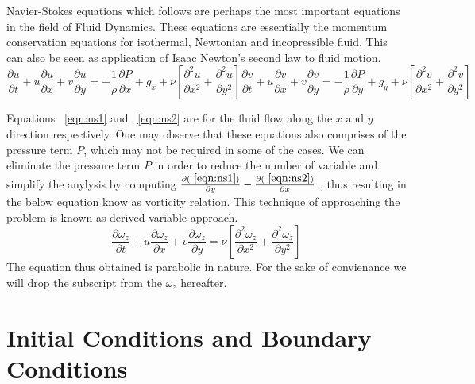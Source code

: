 \documentclass{article}
\begin{document}
Navier-Stokes equations which follows are perhaps the most important equations in the field of Fluid Dynamics. These equations are essentially the momentum conservation equations for isothermal, Newtonian and incopressible fluid. This can also be seen as application of Isaac Newton's second law to fluid motion.
\begin{subequations}
\begin{equation}
\label{eqn:ns1}
\frac{\partial u}{\partial t} + u\frac{\partial u}{\partial x} + v\frac{\partial u}{\partial y}= -\frac{1}{\rho}\frac{\partial P}{\partial x} + g_x + \nu \left [ \frac{\partial^2 u}{\partial x^2} +  \frac{\partial^2 u}{\partial y^2} \right ]
\end{equation}

\begin{equation}
\label{eqn:ns2}
\frac{\partial v}{\partial t} + u\frac{\partial v}{\partial x} + v\frac{\partial v}{\partial y}= -\frac{1}{\rho}\frac{\partial P}{\partial y} + g_y + \nu \left [ \frac{\partial^2 v}{\partial x^2} +  \frac{\partial^2 v}{\partial y^2} \right ]
\end{equation}
\end{subequations}

Equations ~\ref{eqn:ns1} and ~\ref{eqn:ns2} are for the fluid flow along the $x$ and $y$ direction respectively.  One may observe that these equations also comprises of the pressure term $P$, which may not be required in some of the cases. We can eliminate the pressure term $P$ in order to reduce the number of variable and simplify the anylysis by computing $\frac{\partial (~\ref{eqn:ns1})}{\partial y} - \frac{\partial (~\ref{eqn:ns2})}{\partial x} $ , thus resulting in the below equation know as vorticity relation. This technique of approaching the problem is known as derived variable approach. 
\begin{equation}
\label{eqn:vorticityFnEqn}
\frac{\partial \omega_z}{\partial t} + u\frac{\partial \omega_z}{\partial x} + v\frac{\partial \omega_z}{\partial y}= \nu \left [ \frac{\partial^2 \omega_z}{\partial x^2} +  \frac{\partial^2 \omega_z}{\partial y^2} \right ]
\end{equation}
The equation thus obtained is parabolic in nature. For the sake of convienance we will drop the subscript from the $\omega_z$ hereafter.




\section{Initial Conditions and Boundary Conditions}
\end{document}
